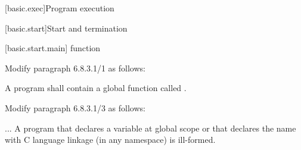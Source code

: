 \setcounter{section}{7}
[basic.exec]{Program execution}

\setcounter{subsection}{2}
[basic.start]{Start and termination}

\setcounter{subsubsection}{0}
[basic.start.main]{ function}

Modify paragraph 6.8.3.1/1 as follows:
\begin{std.txt}
  \resetalinea[0]
  \alinea
  A program shall contain a global function called 
  .
\end{std.txt}

Modify paragraph 6.8.3.1/3 as follows:
\begin{std.txt}
  \resetalinea[2]
  \alinea
  ...
  A program that declares a variable  at global scope
  or that declares the name  with C language linkage (in any namespace)
  is ill-formed.
\end{std.txt}
